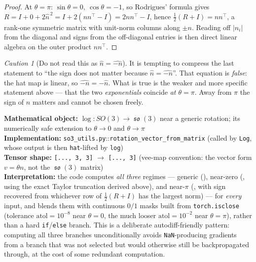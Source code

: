\documentclass[11pt,a4paper]{report}
\theoremstyle{definition}
\theoremstyle{remark}
\newtheorem{caution}[caution]{Caution}
\DeclareMathOperator{\so}{\mathfrak{so}}
\newcommand{\file}[1]{\texttt{#1}}
\newcommand{\pyfunc}[1]{\texttt{#1}}
\newcommand{\shape}[1]{\texttt{[#1]}}
\begin{document}
\begin{proof}
At $\theta=\pi$: $\sin\theta=0,\ \cos\theta=-1$, so Rodrigues' formula gives
$R = I + 0 + 2\widehat n^{\,2} = I + 2(nn^\top-I) = 2nn^\top - I$, hence
$\tfrac12(R+I)=nn^\top$, a rank-one symmetric matrix with unit-norm columns
along $\pm n$. Reading off $|n_i|$ from the diagonal and signs from the
off-diagonal entries is then direct linear algebra on the outer product
$nn^\top$.
\end{proof}

\begin{caution}[Do not read this as $\widehat n=\widehat{-n}$]
\label{caution:log-pi-sign}
It is tempting to compress the last statement to ``the sign does not matter
because $\widehat n=\widehat{-n}$''. That equation is \emph{false}: the hat
map is linear, so $\widehat{-n}=-\widehat n$. What is true is the weaker and
more specific statement above --- that the two \emph{exponentials} coincide
\emph{at $\theta=\pi$}. Away from $\pi$ the sign of $n$ matters and cannot be
chosen freely.
\end{caution}

\begin{codebox}
\textbf{Mathematical object:} $\log:SO(3)\to\so(3)$ near a generic rotation;
its numerically safe extension to $\theta\to0$ and $\theta\to\pi$ \\
\textbf{Implementation:} \file{so3\_utils.py}::\pyfunc{rotation\_vector\_from\_matrix}
(called by \pyfunc{Log}, whose output is then \pyfunc{hat}-lifted by
\pyfunc{log}) \\
\textbf{Tensor shape:} \shape{..., 3, 3} $\to$ \shape{..., 3} (vee-map
convention: the vector form $v=\theta n$, not the $\so(3)$ matrix) \\
\textbf{Interpretation:} the code computes \emph{all three} regimes ---
generic (), near-zero
(, using the exact Taylor truncation derived
above), and near-$\pi$ (, with sign recovered from
whichever row of $\tfrac12(R+I)$ has the largest norm) --- for \emph{every}
input, and blends them with continuous $0/1$ masks built from
\pyfunc{torch.isclose} (tolerance $\mathrm{atol}=10^{-8}$ near $\theta=0$,
the much looser $\mathrm{atol}=10^{-2}$ near $\theta=\pi$), rather than a
hard \texttt{if}/\texttt{else} branch. This is a deliberate autodiff-friendly
pattern: computing all three branches unconditionally avoids
\texttt{NaN}-producing gradients from a branch that was not selected but
would otherwise still be backpropagated through, at the cost of some
redundant computation.
\end{codebox}
\end{document}
